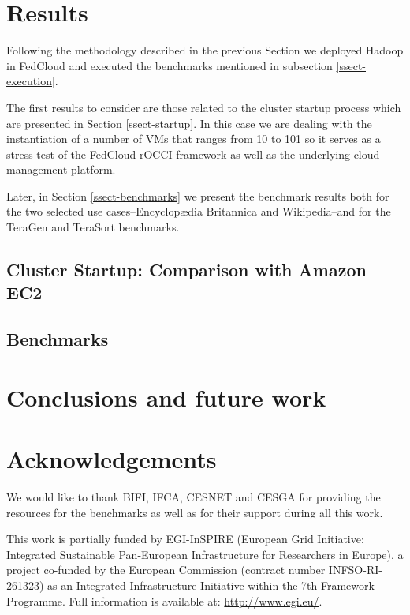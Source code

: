 \documentclass[oribibl]{llncs_Ibergrid2013}
\begin{document}
\section{Results}
\label{sect-results}
Following the methodology described in the previous Section we deployed Hadoop in FedCloud and executed the benchmarks mentioned in subsection \ref{ssect-execution}. 

The first results to consider are those related to the cluster startup process which are presented in Section \ref{ssect-startup}. In this case we are dealing with the instantiation of a number of VMs that ranges from 10 to 101 so it serves as a stress test of the FedCloud rOCCI framework as well as the underlying cloud management platform.

Later, in Section \ref{ssect-benchmarks} we present the benchmark results both for the two selected use cases--Encyclop{\ae}dia Britannica and Wikipedia--and for the TeraGen and TeraSort benchmarks.

\subsection{Cluster Startup: Comparison with Amazon EC2}
\label{sect-startup}



\subsection{Benchmarks}
\label{sect-benchmarks}


\section{Conclusions and future work}
\label{sect-conclusions}


\section*{Acknowledgements}
\label{sect-acknowledgements}
We would like to thank BIFI, IFCA, CESNET and CESGA for providing the resources for the benchmarks 
as well as for their support during all this work.

This work is partially funded by EGI-InSPIRE (European Grid Initiative: Integrated Sustainable
Pan-European Infrastructure for Researchers in Europe), a project co-funded by the European Commission 
(contract number INFSO-RI-261323) as an Integrated Infrastructure Initiative within the 7th Framework 
Programme. Full information is available at: \url{http://www.egi.eu/}.

%
%
%


\end{document}
